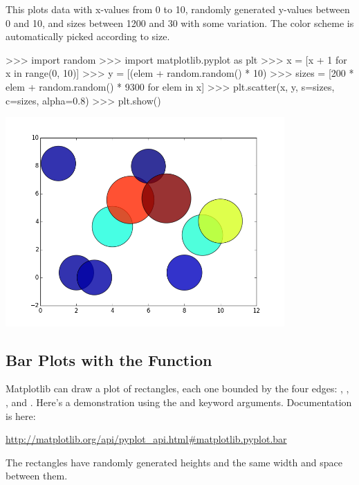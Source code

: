 \documentclass[11pt]{cselabheader}
\begin{document}
This plots data with x-values from 0 to 10, randomly generated
y-values between 0 and 10, and sizes between 1200 and 30 with some variation.
The color scheme is automatically picked according to size.

\begin{pyconcode}
>>> import random
>>> import matplotlib.pyplot as plt
>>> x = [x + 1 for x in range(0, 10)]
>>> y = [(elem + random.random() * 10) %
>>> sizes = [200 * elem + random.random() * 9300 for elem in x]
>>> plt.scatter(x, y, s=sizes, c=sizes, alpha=0.8)
>>> plt.show()
\end{pyconcode}

\begin{center}
\includegraphics[width=0.8\textwidth]{img/matplotlib_scatter.png}
\end{center}

\subsection{Bar Plots with the  Function}

Matplotlib can draw a plot of rectangles, each one bounded by the four edges:
, , , and
. Here's a demonstration using the
 and  keyword arguments.
Documentation is here:

\begin{center}
\url{http://matplotlib.org/api/pyplot_api.html#matplotlib.pyplot.bar}
\end{center}


The rectangles have randomly generated heights and the same width and space
between them.
\end{document}
